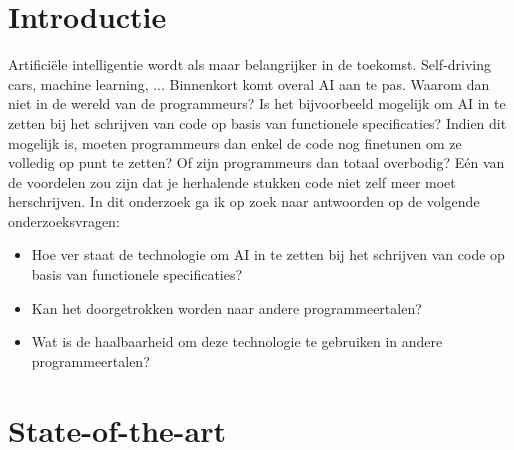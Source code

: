 \documentclass[fleqn,10pt]{voorstel}
\affiliation{\textbf{Contact:}
  \textsuperscript{1} \href{mailto:preben.leroy.w1789@student.hogent.be}{preben.leroy.w1789@student.hogent.be}}
\begin{document}
\flushbottom %
\maketitle %
\tableofcontents %
\thispagestyle{empty} %



\section{Introductie} %
\label{sec:introductie}

Artificiële intelligentie wordt als maar belangrijker in de toekomst. Self-driving cars, machine learning, ... Binnenkort komt overal AI aan te pas. Waarom dan niet in de wereld van de programmeurs? Is het bijvoorbeeld mogelijk om AI in te zetten bij het schrijven van code op basis van functionele specificaties? Indien dit mogelijk is, moeten programmeurs dan enkel de code nog finetunen om ze volledig op punt te zetten? Of zijn programmeurs dan totaal overbodig? Eén van de voordelen zou zijn dat je herhalende stukken code niet zelf meer moet herschrijven.
\break \break \break
In dit onderzoek ga ik op zoek naar antwoorden op de volgende onderzoeksvragen:
\begin{itemize}
	\item Hoe ver staat de technologie om AI in te zetten bij het schrijven van code op basis van functionele specificaties?
	\item Kan het doorgetrokken worden naar andere programmeertalen?
	\item Wat is de haalbaarheid om deze technologie te gebruiken in andere programmeertalen?
\end{itemize}



\section{State-of-the-art}
\label{sec:state-of-the-art}
\end{document}
